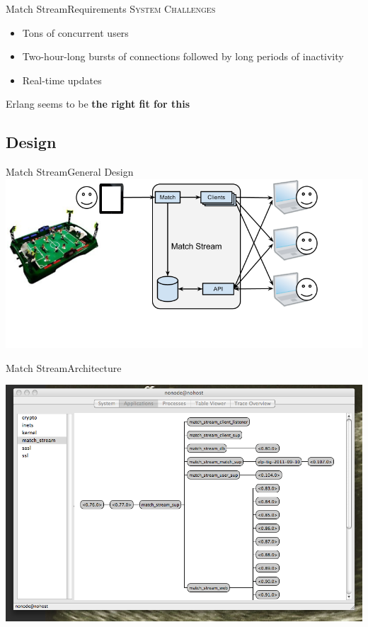 \documentclass[utf8]{beamer}
\begin{document}
\begin{frame}{Match Stream}{Requirements}
	\textsc{System Challenges}
	\begin{itemize}
		\item<+-> Tons of concurrent users
		\item<+-> Two-hour-long bursts of connections followed by long periods of inactivity
		\item<+-> Real-time updates
	\end{itemize}
	\onslide<+->Erlang seems to be \textbf{the right fit for this}
\end{frame}

\subsection{Design}
\begin{frame}{Match Stream}{General Design}
	\includegraphics[width=\textwidth]{img/MatchStream.png}
\end{frame}
\begin{frame}{Match Stream}{Architecture}
	\begin{center}
		\includegraphics[height=.75\textheight]{img/running.png}
	\end{center}
\end{frame}
\end{document}

